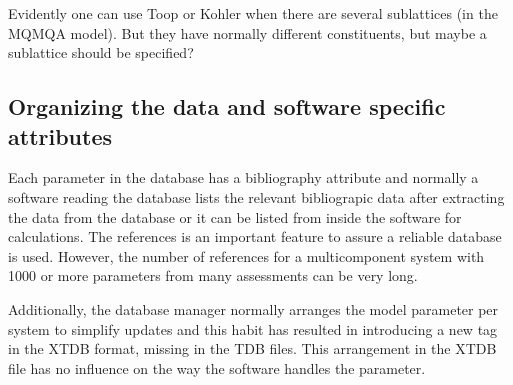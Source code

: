 \documentclass{article}
\begin{document}
\bigskip
Evidently one can use Toop or Kohler when there are several
sublattices (in the MQMQA model).  But they have normally different
constituents, but maybe a sublattice should be specified?

\newpage 

\subsection{Organizing the data and software specific attributes}\label{sec:subsys}\label{sec:soft}

Each parameter in the database has a bibliography attribute and
normally a software reading the database lists the relevant
bibliograpic data after extracting the data from the database or it
can be listed from inside the software for calculations.  The
references is an important feature to assure a reliable database is
used.  However, the number of references for a multicomponent system
with 1000 or more parameters from many assessments can be very long.

Additionally, the database manager normally arranges the model
parameter per system to simplify updates and this habit has resulted
in introducing a new tag in the XTDB format, missing in the TDB files.
This arrangement in the XTDB file has no influence on the way the
software handles the parameter.
\end{document}
